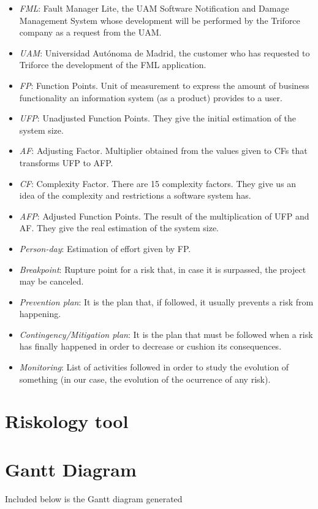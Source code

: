 \documentclass[11pt]{report}
\begin{document}
\begin{itemize}
\item \emph{FML}: Fault Manager Lite, the UAM Software Notification and Damage Management System whose development will be performed by the Triforce company as a request from the UAM.

\item \emph{UAM}: Universidad Autónoma de Madrid, the customer who has requested to Triforce the development of the FML application.

\item \emph{FP}: Function Points. Unit of measurement to express the amount of business functionality an information system (as a product) provides to a user.

\item \emph{UFP}: Unadjusted Function Points. They give the initial estimation of the system size.

\item \emph{AF}: Adjusting Factor. Multiplier obtained from the values given to CFs that transforms UFP to AFP.

\item \emph{CF}: Complexity Factor. There are 15 complexity factors. They give us an idea of the complexity and restrictions a software system has.

\item \emph{AFP}: Adjusted Function Points. The result of the multiplication of UFP and AF. They give the real estimation of the system size.

\item \emph{Person-day}: Estimation of effort given by FP.

\item \emph{Breakpoint}: Rupture point for a risk that, in case it is surpassed, the project may be canceled.

\item \emph{Prevention plan}: It is the plan that, if followed, it usually prevents a risk from happening.

\item \emph{Contingency/Mitigation plan}: It is the plan that must be followed when a risk has finally happened in order to decrease or cushion its consequences.

\item \emph{Monitoring}: List of activities followed in order to study the evolution of something (in our case, the evolution of the ocurrence of any risk).
\end{itemize}

\chapter{Riskology tool}
\label{chapRiskology}


\chapter{Gantt Diagram}
\label{chapGantt}
Included below is the Gantt diagram generated


\end{document}
